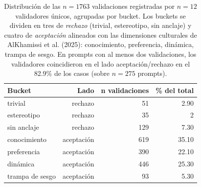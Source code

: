 \begin{table}[ht]
    \centering
    \caption{Distribución de las $n=1763$ validaciones registradas por $n=12$ validadores únicos, agrupadas por bucket. Los buckets se dividen en tres de \textit{rechazo} (trivial, estereotipo, sin anclaje) y cuatro de \textit{aceptación} alineados con las dimensiones culturales de AlKhamissi et al. (2025): conocimiento, preferencia, dinámica, trampa de sesgo. En prompts con al menos dos validaciones, los validadores coincidieron en el lado aceptación/rechazo en el 82.9\% de los casos (sobre $n=275$ prompts).}
    \label{tab:validacion}
    \begin{tabular}{lrrr}
    \toprule
    Bucket & Lado & n validaciones & \% del total \\
    \midrule
    trivial & rechazo & 51 & 2.90 \\
    estereotipo & rechazo & 35 & 2 \\
    sin anclaje & rechazo & 129 & 7.30 \\
    conocimiento & aceptación & 619 & 35.10 \\
    preferencia & aceptación & 390 & 22.10 \\
    dinámica & aceptación & 446 & 25.30 \\
    trampa de sesgo & aceptación & 93 & 5.30 \\
    \bottomrule
    \end{tabular}
\end{table}
